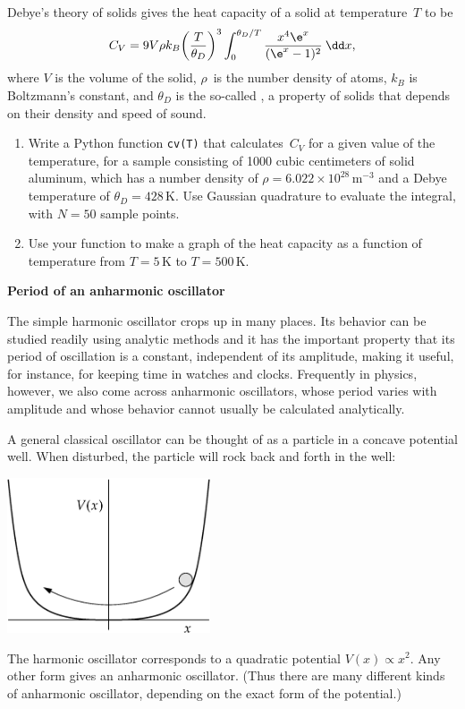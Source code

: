 \documentclass[12pt]{article}
\begin{document}
\begin{exercises}
\exskip Debye's theory of solids gives the heat capacity of a solid at
temperature~$T$ to be
\begin{displaymath}
C_V = 9V\rho k_B \biggl( {T\over\theta_D} \biggr)^3 \int_0^{\theta_D/T}
      {x^4 \e^x\over(\e^x-1)^2}\>\dd x,
\end{displaymath}
where $V$ is the volume of the solid, $\rho$~is the number density of
atoms, $k_B$ is Boltzmann's constant, and $\theta_D$ is the so-called
, a property of solids that depends on their
density and speed of sound.
\begin{enumerate}\setlength{\itemsep}{0pt}
\item Write a Python function \verb|cv(T)| that calculates~$C_V$ for a
  given value of the temperature, for a sample consisting of 1000 cubic
  centimeters of solid aluminum, which has a number density of
  $\rho=6.022\times10^{28}\,\mathrm{m}^{-3}$ and a Debye temperature of
  $\theta_D=428\,$K.  Use Gaussian quadrature to evaluate the integral,
  with $N=50$ sample points.
\item Use your function to make a graph of the heat capacity as a function
  of temperature from $T=5\,$K to $T=500\,$K.
\end{enumerate}



\exercise \textbf{Period of an anharmonic oscillator}

\exskip The simple harmonic oscillator crops up in many places.  Its
behavior can be studied readily using analytic methods and it has the
important property that its period of oscillation is a constant,
independent of its amplitude, making it useful, for instance, for keeping
time in watches and clocks.  Frequently in physics, however, we also come
across anharmonic oscillators, whose period varies with amplitude and whose
behavior cannot usually be calculated analytically.

A general classical oscillator can be thought of as a particle in a concave
potential well.  When disturbed, the particle will rock back and forth in
the well:
\bigskip
\begin{center}
\includegraphics[width=6cm]{anharmonic.eps}
\end{center}
The harmonic oscillator corresponds to a quadratic potential $V(x) \propto
x^2$.  Any other form gives an anharmonic oscillator.  (Thus there are many
different kinds of anharmonic oscillator, depending on the exact form of
the potential.)


\end{exercises}
\end{document}
